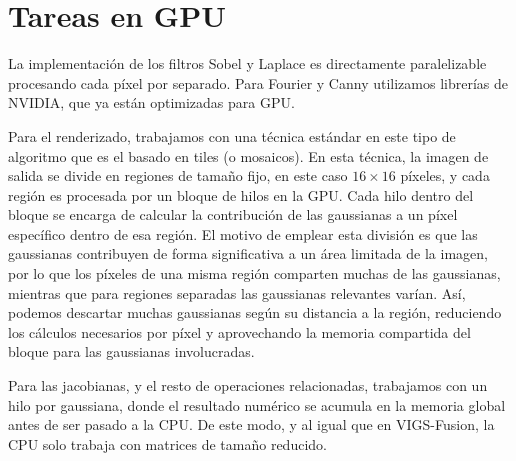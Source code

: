 \section{Tareas en GPU}

La implementación de los filtros Sobel y Laplace es directamente paralelizable procesando cada píxel por separado. Para Fourier y Canny utilizamos librerías de NVIDIA, que ya están optimizadas para GPU.

Para el renderizado, trabajamos con una técnica estándar en este tipo de algoritmo que es el basado en tiles (o mosaicos). En esta técnica, la imagen de salida se divide en regiones de tamaño fijo, en este caso $16 \times 16$ píxeles, y cada región es procesada por un bloque de hilos en la GPU. Cada hilo dentro del bloque se encarga de calcular la contribución de las gaussianas a un píxel específico dentro de esa región. El motivo de emplear esta división es que las gaussianas contribuyen de forma significativa a un área limitada de la imagen, por lo que los píxeles de una misma región comparten muchas de las gaussianas, mientras que para regiones separadas las gaussianas relevantes varían. Así, podemos descartar muchas gaussianas según su distancia a la región, reduciendo los cálculos necesarios por píxel y aprovechando la memoria compartida del bloque para las gaussianas involucradas.

Para las jacobianas, y el resto de operaciones relacionadas, trabajamos con un hilo por gaussiana, donde el resultado numérico se acumula en la memoria global antes de ser pasado a la CPU. De este modo, y al igual que en VIGS-Fusion, la CPU solo trabaja con matrices de tamaño reducido.



